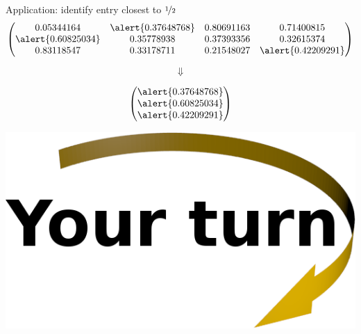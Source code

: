 \documentclass[svgnames]{beamer}
\begin{document}
\begin{frame}{Application: identify entry closest to $\nicefrac{1}{2}$}
 \begin{displaymath}
  \begin{pmatrix}
   0.05344164 & \alert{0.37648768} & 0.80691163 & 0.71400815\\
   \alert{0.60825034} & 0.35778938 & 0.37393356 & 0.32615374\\
   0.83118547 & 0.33178711 & 0.21548027 & \alert{0.42209291}
  \end{pmatrix}
 \end{displaymath}

 \begin{displaymath}
  \Downarrow
 \end{displaymath}

 \begin{displaymath}
  \begin{pmatrix}
   \alert{0.37648768}\\ \alert{0.60825034}\\ \alert{0.42209291}
  \end{pmatrix}
 \end{displaymath}

 \vspace{0.3truecm}
 \includegraphics[width=3truecm]{yourturn}\qquad
\end{frame}
\end{document}
